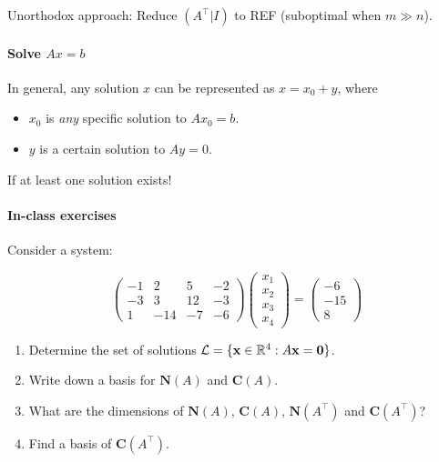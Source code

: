 \documentclass{article}
\begin{document}
Unorthodox approach: Reduce $(A^\top | I)$ to REF (suboptimal when $m \gg n$).

\paragraph{Solve $Ax = b$} In general, any solution $x$ can be represented as $x = x_0 + y$, where
\begin{itemize}
    \item $x_0$ is \textit{any} specific solution to $Ax_0 = b$.
    \item $y$ is a certain solution to $Ay = 0$.
\end{itemize}
If at least one solution exists!

\paragraph{In-class exercises} Consider a system:

$$
\begin{pmatrix}
    -1 & 2 & 5 & -2 \\
    -3 & 3 & 12 & -3 \\
    1 & -14 & -7 & -6
\end{pmatrix} \begin{pmatrix}
    x_1 \\ x_2 \\ x_3 \\ x_4
\end{pmatrix} = \begin{pmatrix}
    -6 \\ -15 \\ 8
\end{pmatrix}
$$

\begin{enumerate}
\item Determine the set of solutions $\mathcal L = \{\mathbf x \in \mathbb{R}^4 : A \mathbf x = \mathbf 0\}$.
\item Write down a basis for $\mathbf N(A)$ and $\mathbf C(A)$.
\item What are the dimensions of $\mathbf N(A)$, $\mathbf C(A)$, $\mathbf N(A^\top)$ and $\mathbf C(A^\top)$?
\item Find a basis of $\mathbf C(A^\top)$.
\end{enumerate}
\end{document}
